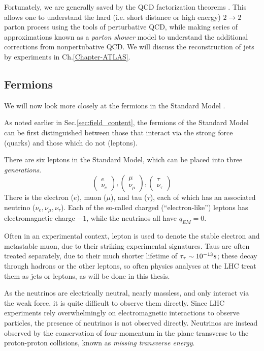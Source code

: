 Fortunately, we are generally saved by the QCD factorization theorems \cite{Collins:1989gx}.
This allows one to understand the hard (i.e. short distance or high energy) $2 \rightarrow 2$ parton process using the tools of perturbative QCD, while making series of approximations known as a \textit{parton shower} model to understand the additional corrections from nonpertubative QCD.
We will discuss the reconstruction of jets by experiments in Ch.\ref{Chapter-ATLAS}.

\subsection{Fermions}

We will now look more closely at the fermions in the Standard Model \cite{Agashe:2014kda}.

As noted earlier in Sec.\ref{sec:field_content}, the fermions of the Standard Model can be first distinguished between those that interact via the strong force (quarks) and those which do not (leptons).

There are six leptons in the Standard Model, which can be placed into three \textit{generations}.
\begin{equation}
\begin{pmatrix} e \\ \nu_e \end{pmatrix} , \begin{pmatrix} \mu \\ \nu_\mu \end{pmatrix}, \begin{pmatrix} \tau \\ \nu_\tau \end{pmatrix}
\end{equation}
There is the electron ($e)$, muon ($\mu$), and tau ($\tau$), each of which has an associated neutrino ($\nu_e, \nu_\mu, \nu_\tau$).
Each of the so-called charged (``electron-like'') leptons has electromagnetic charge $-1$, while the neutrinos all have $q_{EM} = 0$.

Often in an experimental context, lepton is used to denote the stable electron and metastable muon, due to their striking experimental signatures.
Taus are often treated separately, due to their much shorter lifetime of $\tau_{\tau} \sim 10^{-13} s$; these decay through hadrons or the other leptons, so often physics analyses at the LHC treat them as jets or leptons, as will be done in this thesis.

As the neutrinos are electrically neutral, nearly massless, and only interact via the weak force, it is quite difficult to observe them directly.
Since LHC experiments rely overwhelmingly on electromagnetic interactions to observe particles, the presence of neutrinos is not observed directly.
Neutrinos are instead observed by the conservation of four-momentum in the plane transverse to the proton-proton collisions, known as \textit{missing transverse energy}.

